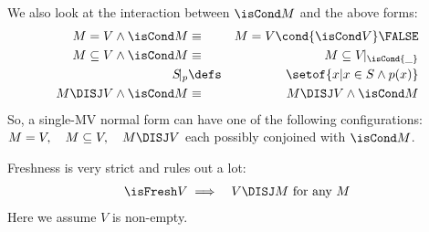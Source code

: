 We also look at the interaction between $\isCond M$
and the above forms:
\begin{eqnarray*}
   M=V\land \isCond M &\equiv&  M=V \cond{\isCond V} \FALSE
\\ M \subseteq V\land \isCond M &\equiv& M \subseteq V\!|_{\isCond{\_}}
\\ S\!|_p &\defs& \setof{x | x \in S \land p(x)}
\\ M \DISJ V\land \isCond M &\equiv& M \DISJ V\land \isCond M
\end{eqnarray*}
So, a single-MV normal form can have one of the following configurations:
$M = V, \quad M \subseteq V, \quad M \DISJ V$
each possibly conjoined with $\isCond M$.

Freshness is very strict and rules out a lot:
\begin{eqnarray*}
   \isFresh V  &\implies& V\DISJ M  \mbox{ for any } M
\end{eqnarray*}
Here we assume $V$ is non-empty.
